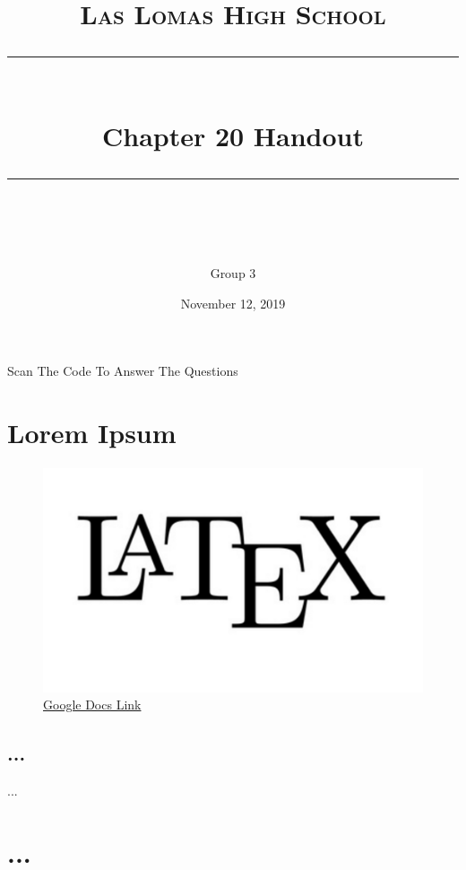 \documentclass[11pt]{scrartcl} %
\title{	
	\normalfont\normalsize
	\textsc{Las Lomas High School}\\ %
	\vspace{25pt} %
	\rule{\linewidth}{0.5pt}\\ %
	\vspace{20pt} %
	{\huge Chapter 20 Handout}\\ %
	\vspace{12pt} %
	\rule{\linewidth}{2pt}\\ %
	\vspace{12pt} %
}
\author{Group 3} %
\date{\normalsize November 12, 2019} %
\begin{document}
\maketitle %


\begin{center} \Large Scan The Code To Answer The Questions \end{center}

\section{Lorem Ipsum}

\paragraph{} \lipsum[1]

\begin{figure}[h] %
	\centering
	\includegraphics[width=0.5\columnwidth]{LaTeX.jpg} %
	\caption{\href{https://docs.google.com/forms/d/e/1FAIpQLSc794dqVmLl6f5EkGEPvQupIA8nWMs-8h1mz9iuT837Zu6yVw/viewform?usp=sf_link}{Google Docs Link}}
\end{figure}


\subsection{...}

...


\section{...}
\end{document}
